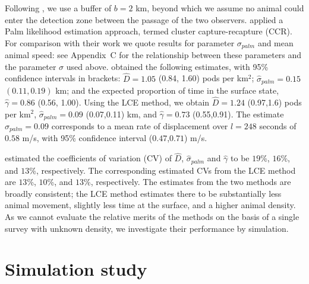 \documentclass[useAMS, usenatbib, referee]{biom}\usepackage[]{graphicx}\usepackage[]{color}
\begin{document}

Following \cite{Stevenson+al:19}, we use a buffer of $b=2$ km, beyond which we assume no animal could enter the detection zone between the passage of the two observers.  \cite{Stevenson+al:19} applied a Palm likelihood estimation approach, termed cluster capture-recapture (CCR).
For comparison with their work we quote results for parameter $\sigma_{palm}$ and mean animal speed: see Appendix~C for the relationship between these parameters and the parameter $\sigma$ used above. \cite{Stevenson+al:19} obtained the following estimates, with 95\% confidence intervals in brackets: $\hat{D}=1.05$ (0.84, 1.60) pods per km$^2$; $\hat{\sigma}_{palm}=0.15$ $(0.11, 0.19)$ km; and the expected proportion of time in the surface state, $\hat{\gamma}=0.86$ (0.56, 1.00). Using the LCE method, we obtain $\hat{D}=1.24$ (0.97,1.6) pods per km$^2$, $\hat{\sigma}_{palm}=0.09$ (0.07,0.11) km, and $\hat{\gamma}=0.73$ (0.55,0.91). The estimate $\hat{\sigma}_{palm}=0.09$ corresponds to a mean rate of displacement over $l=248$ seconds of $0.58$ m/s, with 95\% confidence interval ($0.47$,$0.71$) m/s.

\cite{Stevenson+al:19} estimated the coefficients of variation (CV) of $\hat{D}$, $\hat{\sigma}_{palm}$ and $\hat{\gamma}$ to be $19$\%, $16$\%, and $13$\%, respectively. The corresponding estimated CVs from the LCE method are $13$\%, $10$\%, and $13$\%, respectively. The estimates from the two methods are broadly consistent; the LCE method estimates there to be substantially less animal movement, slightly less time at the surface, and a higher animal density. As we cannot evaluate the relative merits of the methods on the basis of a single survey with unknown density, we investigate their performance by simulation.


\section{Simulation study \label{sec:sim}}

\end{document}

